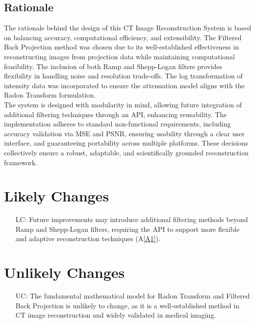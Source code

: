 \documentclass[12pt]{article}
\newcounter{lcnum} %
\newcounter{ucnum} %
\begin{document}
\subsection{Rationale}
The rationale behind the design of this CT Image Reconstruction System is based
on balancing accuracy, computational efficiency, and extensibility. The Filtered
Back Projection method was chosen due to its well-established
effectiveness in reconstructing images from projection data while maintaining
computational feasibility. The inclusion of both Ramp and Shepp-Logan filters
provides flexibility in handling noise and resolution trade-offs. The log
transformation of intensity data was incorporated to ensure the attenuation
model aligns with the Radon Transform formulation.\\

The system is designed with modularity in mind, allowing future integration of
additional filtering techniques through an API, enhancing reusability. The
implementation adheres to standard non-functional requirements, including
accuracy validation via MSE and PSNR, ensuring usability through a clear user
interface, and guaranteeing portability across multiple platforms. These
decisions collectively ensure a robust, adaptable, and scientifically grounded
reconstruction framework.

\section{Likely Changes}

\noindent \begin{itemize}

\item[LC\refstepcounter{lcnum}\thelcnum\label{LC_1}:] Future improvements may
  introduce additional filtering methods beyond Ramp and Shepp-Logan filters,
  requiring the API to support more flexible and adaptive reconstruction
  techniques (A\ref{A1}).

\end{itemize}

\section{Unlikely Changes}

\noindent \begin{itemize}

\item[UC\refstepcounter{ucnum}\theucnum\label{UC_1}:] The fundamental mathematical
  model for Radon Transform and Filtered Back Projection is unlikely to change,
  as it is a well-established method in CT image reconstruction and widely
  validated in medical imaging.
\end{itemize}
\end{document}
